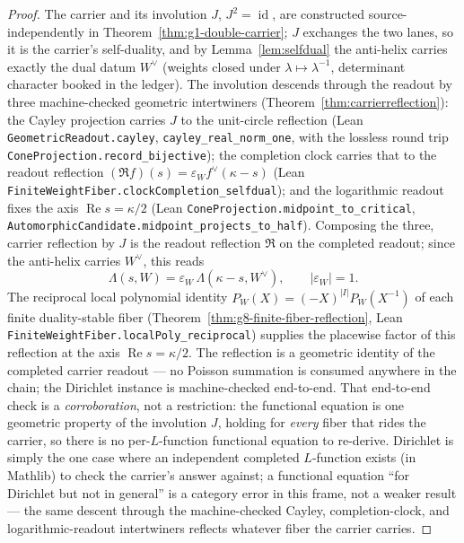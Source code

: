\documentclass[11pt]{article}
\theoremstyle{definition}
\renewcommand{\Re}{\operatorname{Re}}
\begin{document}
\begin{proof}
The carrier and its involution \(J\), \(J^2=\operatorname{id}\), are constructed
source-independently in Theorem~\ref{thm:g1-double-carrier}; \(J\) exchanges the
two lanes, so it is the carrier's self-duality, and by Lemma~\ref{lem:selfdual}
the anti-helix carries exactly the dual datum \(W^\vee\) (weights closed under
\(\lambda\mapsto\lambda^{-1}\), determinant character booked in the ledger).
The involution descends through the readout by three machine-checked geometric
intertwiners (Theorem~\ref{thm:carrierreflection}): the Cayley projection
carries \(J\) to the unit-circle reflection (Lean \texttt{GeometricReadout.cayley},
\texttt{cayley\_real\_norm\_one}, with the lossless round trip
\texttt{ConeProjection.record\_bijective}); the completion clock carries that to the
readout reflection \((\mathfrak R f)(s)=\varepsilon_W f^\vee(\kappa-s)\) (Lean
\texttt{FiniteWeightFiber.clockCompletion\_selfdual}); and the
logarithmic readout fixes the axis \(\Re s=\kappa/2\) (Lean
\texttt{ConeProjection.midpoint\_to\_critical},
\texttt{AutomorphicCandidate.midpoint\_projects\_to\_half}).  Composing the
three, carrier reflection by \(J\) is the readout reflection \(\mathfrak R\) on
the completed readout; since the anti-helix carries \(W^\vee\), this reads
\[
\Lambda(s,W)=\varepsilon_W\,\Lambda(\kappa-s,W^\vee),\qquad |\varepsilon_W|=1.
\]
The reciprocal local polynomial identity \(P_W(X)=(-X)^{|I|}P_W(X^{-1})\) of each
finite duality-stable fiber (Theorem~\ref{thm:g8-finite-fiber-reflection}, Lean
\texttt{FiniteWeightFiber.localPoly\_reciprocal}) supplies the placewise factor
of this reflection at the axis \(\Re s=\kappa/2\).  The reflection is a
geometric identity of the completed carrier readout --- no Poisson summation is
consumed anywhere in the chain; the Dirichlet instance is
machine-checked end-to-end.  That end-to-end check is a \emph{corroboration},
not a restriction: the functional equation is one geometric property of the
involution \(J\), holding for \emph{every} fiber that rides the carrier, so there
is no per-\(L\)-function functional equation to re-derive.  Dirichlet is simply
the one case where an independent completed \(L\)-function exists (in Mathlib) to
check the carrier's answer against; a functional equation ``for Dirichlet but not
in general'' is a category error in this frame, not a weaker result --- the same
descent through the machine-checked Cayley, completion-clock, and
logarithmic-readout intertwiners reflects whatever fiber the carrier carries.
\end{proof}
\end{document}
